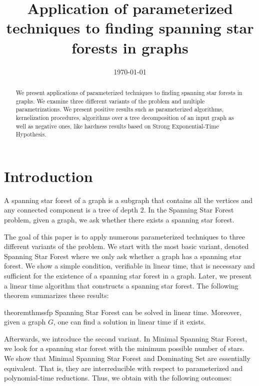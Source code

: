 \documentclass[en]{pracamgr}
\title{Application of parameterized techniques to finding spanning star forests in graphs}
\date{\monthyeardate\today}
\theoremstyle{definition}
\newcommand{\ssfp}{{\sc Spanning Star Forest}}
\newcommand{\mssfp}{{\sc Minimal Spanning Star Forest}}
\newcommand{\domsetp}{{\sc Dominating Set}}
\begin{document}
\maketitle

\begin{abstract}
	We present applications of parameterized techniques to finding spanning star forests in graphs. We examine three different variants of the problem and multiple parametrizations. We present positive results such as parameterized algorithms, kernelization procedures, algorithms over a tree decomposition of an input graph as well as negative ones, like hardness results based on Strong Exponential-Time Hypothesis.
\end{abstract}

\tableofcontents

\chapter{Introduction}

A spanning star forest of a graph is a subgraph that contains all the vertices and any connected component is a tree of depth $2$. In the \ssfp{} problem, given a graph, we ask whether there exists a spanning star forest. 

The goal of this paper is to apply numerous parameterized techniques to three different variants of the problem. We start with the most basic variant, denoted \ssfp{} where we only ask whether a graph has a spanning star forest. We show a simple condition, verifiable in linear time, that is necessary and sufficient for the existence of a spanning star forest in a graph. Later, we present a linear time algorithm that constructs a spanning star forest. The following theorem summarizes these results:

\begin{restatable}{theorem}{thmssfp}\label{thm-ssfp}
	\ssfp{} can be solved in linear time. Moreover, given a graph $G$, one can find a solution in linear time if it exists.
\end{restatable}

Afterwards, we introduce the second variant. In \mssfp{}, we look for a spanning star forest with the minimum possible number of stars. We show that \mssfp{} and \domsetp{} are essentially equivalent. That is, they are interreducible with respect to parameterized and polynomial-time reductions. Thus, we obtain with the following outcomes:
\end{document}
